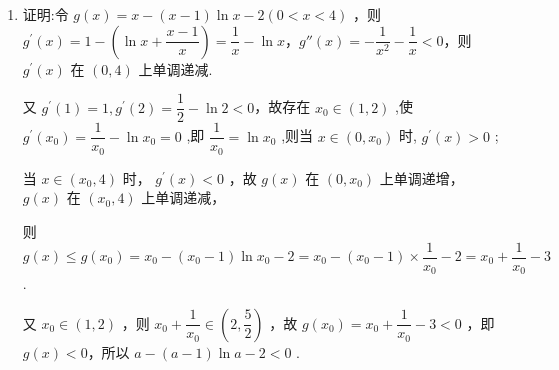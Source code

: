 \begin{enumerate}
\begin{enumerate}
\begin{jieda}
\begin{enumerate}
                令 $t = {{e}}^{x}$ ,则 $- {t}^{2} + {4t} - a = 0$ 有两个正根,
                
                令 ${t}_{1} = {{e}}^{{x}_{1}},{t}_{2} = {{e}}^{{x}_{2}}$ ,则 ${t}_{1},{t}_{2}$ 是方程 ${t}^{2} - {4t} + a = 0$ 的两个正根,
                
                则 $\left\{  \begin{matrix} \Delta  = {\left( -4\right) }^{2} - {4a} = {16} - {4a} > 0 \\  {t}_{1}{t}_{2} = a > 0 \\  {t}_{1} + {t}_{2} = 4 \end{matrix}\right.$ ,解得 $0 < a < 4$ .

                经检验，此时$f(x)$有两个极值点.

                \item 证明:令 $g\left( x\right)  = x - \left( {x - 1}\right) \ln x - 2\left( {0 < x < 4}\right)$ ，则 ${g}^{\prime }\left( x\right)  = 1 - \left( {\ln x + \dfrac{x - 1}{x}}\right)  = \dfrac{1}{x} - \ln x$，$g''\left( x\right)  =  - \dfrac{1}{{x}^{2}} - \dfrac{1}{x} < 0$，则 ${g}^{\prime }\left( x\right)$ 在 $\left( {0,4}\right)$ 上单调递减.
                
                又 ${g}^{\prime }\left( 1\right) = 1,{g}^{\prime }\left( 2\right)  = \dfrac{1}{2} - \ln 2 < 0$，故存在 ${x}_{0} \in  \left( {1,2}\right)$ ,使 ${g}^{\prime }\left( {x}_{0}\right)  = \dfrac{1}{{x}_{0}} - \ln {x}_{0} = 0$ ,即 $\dfrac{1}{{x}_{0}} = \ln {x}_{0}$ ,则当 $x \in  \left( {0,{x}_{0}}\right)$ 时, ${g}^{\prime }\left( x\right)  > 0$ ;
                
                当 $x \in  \left( {{x}_{0},4}\right)$ 时， ${g}^{\prime }\left( x\right)  < 0$ ，故 $g\left( x\right)$ 在 $\left( {0,{x}_{0}}\right)$ 上单调递增， $g\left( x\right)$ 在 $\left( {{x}_{0},4}\right)$ 上单调递减，
                
                则 $g\left( x\right)  \leq  g\left( {x}_{0}\right)  = {x}_{0} - \left( {{x}_{0} - 1}\right) \ln {x}_{0} - 2 = {x}_{0} - \left( {{x}_{0} - 1}\right)  \times  \dfrac{1}{{x}_{0}} - 2 = {x}_{0} + \dfrac{1}{{x}_{0}} - 3$ .
                
                又 ${x}_{0} \in  \left( {1,2}\right)$ ，则 ${x}_{0} + \dfrac{1}{{x}_{0}} \in  \left( {2,\dfrac{5}{2}}\right)$ ，故 $g\left( {x}_{0}\right)  = {x}_{0} + \dfrac{1}{{x}_{0}} - 3 < 0$ ，即 $g\left( x\right)  < 0$，所以 $a - \left( {a - 1}\right) \ln a - 2 < 0$ .
            \end{enumerate}
        \end{jieda}
        

\end{enumerate}
\end{enumerate}

